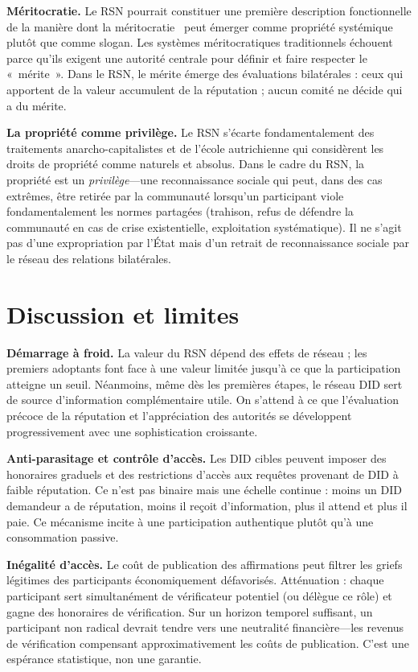 \documentclass[11pt,a4paper,twocolumn]{article}
\begin{document}
\textbf{Méritocratie.} Le RSN pourrait constituer une première description fonctionnelle de la manière dont la méritocratie~\cite{young1958} peut émerger comme propriété systémique plutôt que comme slogan. Les systèmes méritocratiques traditionnels échouent parce qu'ils exigent une autorité centrale pour définir et faire respecter le «~mérite~». Dans le RSN, le mérite émerge des évaluations bilatérales : ceux qui apportent de la valeur accumulent de la réputation ; aucun comité ne décide qui a du mérite.

\textbf{La propriété comme privilège.} Le RSN s'écarte fondamentalement des traitements anarcho-capitalistes et de l'école autrichienne qui considèrent les droits de propriété comme naturels et absolus. Dans le cadre du RSN, la propriété est un \emph{privilège}---une reconnaissance sociale qui peut, dans des cas extrêmes, être retirée par la communauté lorsqu'un participant viole fondamentalement les normes partagées (trahison, refus de défendre la communauté en cas de crise existentielle, exploitation systématique). Il ne s'agit pas d'une expropriation par l'État mais d'un retrait de reconnaissance sociale par le réseau des relations bilatérales.

\section{Discussion et limites}

\textbf{Démarrage à froid.} La valeur du RSN dépend des effets de réseau ; les premiers adoptants font face à une valeur limitée jusqu'à ce que la participation atteigne un seuil. Néanmoins, même dès les premières étapes, le réseau DID sert de source d'information complémentaire utile. On s'attend à ce que l'évaluation précoce de la réputation et l'appréciation des autorités se développent progressivement avec une sophistication croissante.

\textbf{Anti-parasitage et contrôle d'accès.} Les DID cibles peuvent imposer des honoraires graduels et des restrictions d'accès aux requêtes provenant de DID à faible réputation. Ce n'est pas binaire mais une échelle continue : moins un DID demandeur a de réputation, moins il reçoit d'information, plus il attend et plus il paie. Ce mécanisme incite à une participation authentique plutôt qu'à une consommation passive.

\textbf{Inégalité d'accès.} Le coût de publication des affirmations peut filtrer les griefs légitimes des participants économiquement défavorisés. Atténuation : chaque participant sert simultanément de vérificateur potentiel (ou délègue ce rôle) et gagne des honoraires de vérification. Sur un horizon temporel suffisant, un participant non radical devrait tendre vers une neutralité financière---les revenus de vérification compensant approximativement les coûts de publication. C'est une espérance statistique, non une garantie.
\end{document}
